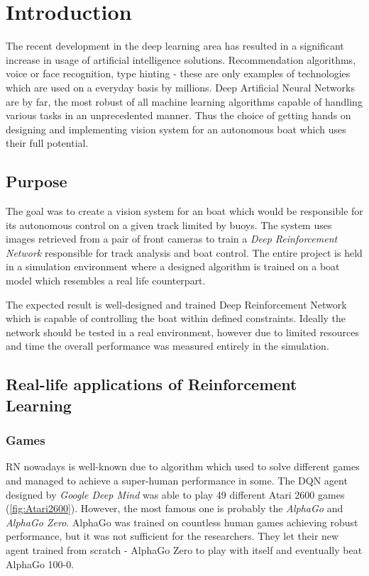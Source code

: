 \chapter{Introduction}
\label{cha:introduction}

The recent development in the deep learning area has resulted in a significant increase in usage of artificial intelligence solutions. Recommendation algorithms, voice or face recognition, type hinting - these are only examples of technologies which are used on a everyday basis by millions. Deep Artificial Neural Networks are by far, the most robust of all machine learning algorithms capable of handling various tasks in an unprecedented manner. Thus the choice of getting hands on designing and implementing vision system for an autonomous boat which uses their full potential.

\section{Purpose}
\label{sec:purpose}

The goal was to create a vision system for an boat which would be responsible for its autonomous control on a given track limited by buoys. The system uses images retrieved from a pair of front cameras to train a \emph{Deep Reinforcement Network} responsible for track analysis and boat control. The entire project is held in a simulation environment where a designed algorithm is trained on a boat model which resembles a real life counterpart. 

The expected result is well-designed and trained Deep Reinforcement Network which is capable of controlling the boat within defined constraints. Ideally the network should be tested in a real environment, however due to limited resources and time the overall performance was measured entirely in the simulation.

\section{Real-life applications of Reinforcement Learning}
\label{sec:real-life-applications-of-deep-learning}

\subsection{Games}
\label{sub:intro-games}
RN nowadays is well-known due to algorithm which used to solve different games and managed to achieve a super-human performance in some.
The DQN agent designed by \emph{Google Deep Mind} was able to play 49 different Atari 2600 games (\ref{fig:Atari2600}). However, the most famous one is probably the \emph{AlphaGo} \cite{AlphaGO}  and \emph{AlphaGo Zero}. AlphaGo was trained on countless human games achieving robust performance, but it was not sufficient for the researchers. They let their new agent trained from scratch - AlphaGo Zero to play with itself and eventually beat AlphaGo 100-0. 


